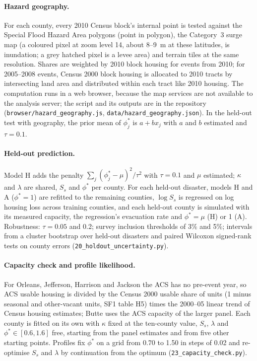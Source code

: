 \documentclass[11pt]{article}
\begin{document}
\paragraph{Hazard geography.} For each county, every 2010 Census block's internal point is tested against the Special Flood Hazard Area polygons (point in polygon), the Category~3 surge map (a coloured pixel at zoom level 14, about 8--9~m at these latitudes, is inundation; a grey hatched pixel is a levee area) and terrain tiles at the same resolution. Shares are weighted by 2010 block housing for events from 2010; for 2005--2008 events, Census 2000 block housing is allocated to 2010 tracts by intersecting land area and distributed within each tract like 2010 housing. The computation runs in a web browser, because the map services are not available to the analysis server; the script and its outputs are in the repository (\texttt{browser/hazard\_geography.js}, \texttt{data/hazard\_geography.json}). In the held-out test with geography, the prior mean of $\phi^*_j$ is $a+bx_j$ with $a$ and $b$ estimated and $\tau=0.1$.

\paragraph{Held-out prediction.} Model H adds the penalty $\sum_j(\phi^*_j-\mu)^2/\tau^2$ with $\tau=0.1$ and $\mu$ estimated; $\kappa$ and $\lambda$ are shared, $S_s$ and $\phi^*$ per county. For each held-out disaster, models H and A ($\phi^*=1$) are refitted to the remaining counties, $\log S_s$ is regressed on log housing loss across training counties, and each held-out county is simulated with its measured capacity, the regression's evacuation rate and $\phi^*=\mu$ (H) or 1 (A). Robustness: $\tau=0.05$ and 0.2; survey inclusion thresholds of 3\% and 5\%; intervals from a cluster bootstrap over held-out disasters and paired Wilcoxon signed-rank tests on county errors (\texttt{20\_holdout\_uncertainty.py}).

\paragraph{Capacity check and profile likelihood.} For Orleans, Jefferson, Harrison and Jackson the ACS has no pre-event year, so ACS usable housing is divided by the Census 2000 usable share of units (1 minus seasonal and other-vacant units, SF1 table H5) times the 2000--05 linear trend of Census housing estimates; Butte uses the ACS capacity of the larger panel. Each county is fitted on its own with $\kappa$ fixed at the ten-county value, $S_s$, $\lambda$ and $\phi^*\in[0.6,1.6]$ free, starting from the panel estimates and from five other starting points. Profiles fix $\phi^*$ on a grid from 0.70 to 1.50 in steps of 0.02 and re-optimise $S_s$ and $\lambda$ by continuation from the optimum (\texttt{23\_capacity\_check.py}).
\end{document}
